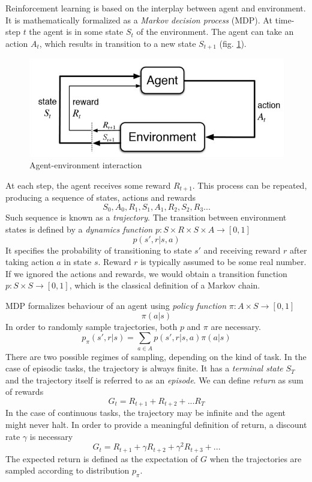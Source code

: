 \documentclass[oneside,english,logo]{amuthesis}
\begin{document}
Reinforcement learning \cite{rl_sutton} is based on the interplay between agent and environment. 
It is mathematically formalized as a \textit{Markov decision process} (MDP).
At time-step $t$ the agent is in some state $S_t$ of the environment. The agent can take an action $A_t$, which results in transition to a new state  $S_{t+1}$ (fig. \ref{fig:agent_env_interaction}). 
\begin{figure}[!htbp]
	\centering
	\includegraphics[width=13cm]{supervised reinforcement learning}
	\caption{Agent-environment interaction}
	\label{fig:agent_env_interaction}
\end{figure}
At each step, the agent receives some reward $R_{t+1}$. This process can be repeated, producing a sequence of states, actions and rewards
\[
S_0, A_0, R_1, S_1, A_1, R_2, S_2, R_3 ...
\]
Such sequence is known as a \textit{trajectory}. The transition between environment states is defined by a \textit{dynamics function} $p:S\times R\times S \times A \rightarrow [0,1]$
\[
p(s',r | s, a)
\]
It specifies the probability of transitioning to state $s'$ and receiving reward $r$ after taking action $a$ in state $s$. Reward $r$ is typically assumed to be some real number. If we ignored the actions and rewards, we would obtain a transition function  $p:S\times S \rightarrow [0,1]$, which is the classical definition of a  Markov chain. 

MDP formalizes behaviour of an agent using \textit{policy function} $\pi:A\times S\rightarrow[0,1]$
\[
\pi(a|s)
\]
In order to randomly sample trajectories, both $p$ and $\pi$ are necessary. 
\[
p_{\pi}(s',r|s) = \sum_{a\in A}p(s',r|s,a)\pi(a|s)
\]
There are two possible regimes of sampling, depending on the kind of task. 
In the case of episodic tasks, the trajectory is always finite. It has a  \textit{terminal state} $S_T$ and the trajectory itself is referred to as an \textit{episode}. We can define \textit{return} as sum of rewards
\[
G_t = R_{t+1}+R_{t+2}+...R_T
\]
In the case of continuous tasks, the trajectory may be infinite and the agent might never halt. In order to provide a meaningful definition of return, a discount rate $\gamma$ is necessary 
\[
G_t = R_{t+1}+\gamma R_{t+2}+\gamma^2 R_{t+3}+...
\]
The expected return is defined as the expectation of $G$ when the trajectories are sampled according to distribution $p_\pi$.
\end{document}

